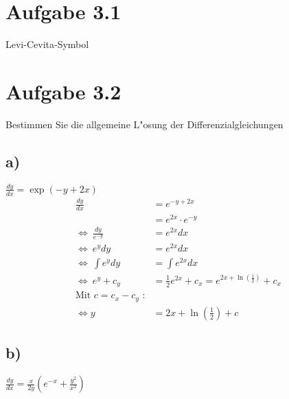 \documentclass{theozettel}
\begin{document}

\section*{Aufgabe 3.1} Levi-Cevita-Symbol\\


\newpage
\section*{Aufgabe 3.2} Bestimmen Sie die allgemeine L"osung der Differenzialgleichungen\\
\subsection*{a)} $\frac{dy}{dx} = \exp\left(-y+2x\right)$\\
\begin{align*}
					\frac{dy}{dx} 	&= e^{-y+2x}\\
									&= e^{2x}\cdot e^{-y}\\
\Leftrightarrow \ \frac{dy}{e^{-y}}	&= e^{2x} dx\\
\Leftrightarrow \ 			e^y dy  &= e^{2x} dx\\
\Leftrightarrow \ 	   \int{e^y dy} &= \int{e^{2x} dx}\\
\Leftrightarrow \ 				e^y +c_y &= \frac{1}{2} e^{2x} + c_x = e^{2x+ \ln\left(\frac{1}{2}\right)}+c_x\\
\text{Mit }c=c_x-c_y \text{ :}\\
\Leftrightarrow y&= 2x+ \ln{\left(\frac{1}{2}\right)}+c
\end{align*}
\subsection*{b)}$\frac{dy}{dx} = \frac{x}{2y}\left(e^{-x}+\frac{y^2}{x^2}\right)$\\
\end{document}
